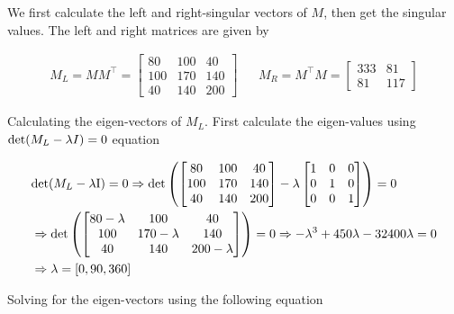 We first calculate the left and right-singular vectors of $M$, then get the singular values. The left and right matrices are given by

\begin{align}
    M_L = M M^\top = \begin{bmatrix}
        80 & 100 & 40 \\
        100 & 170 & 140 \\
        40 & 140 & 200
        \end{bmatrix} &&
    M_R = M^\top M = \begin{bmatrix}
        333 & 81 \\
        81 & 117
        \end{bmatrix}
\end{align}

Calculating the eigen-vectors of $M_L$. First calculate the eigen-values using $\textup{det}(M_L - \lambda I) = 0$ equation

\begin{align}
    &\textup{det}(M_L - \lambda \textup{I}) = 0
    \Rightarrow
    \textup{det} \left (
        \begin{bmatrix}
            80 & 100 & 40 \\
            100 & 170 & 140 \\
            40 & 140 & 200
        \end{bmatrix} - \lambda
        \begin{bmatrix}
            1 & 0 & 0 \\
            0 & 1 & 0 \\
            0 & 0 & 1
        \end{bmatrix}
        \right ) = 0 
    \nonumber \\
    &\Rightarrow \textup{det} \left (
        \begin{bmatrix}
            80 - \lambda & 100 & 40 \\
            100 & 170 - \lambda & 140 \\
            40 & 140 & 200 - \lambda
        \end{bmatrix}
        \right ) = 0
    \Rightarrow -\lambda^3 + 450 \lambda - 32400 \lambda = 0
    \nonumber \\
    &\Rightarrow \lambda = \left [ 0, 90, 360 \right ]
    \nonumber
\end{align}

Solving for the eigen-vectors using the following equation

